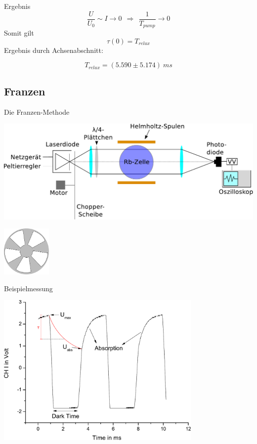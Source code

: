 \documentclass{beamer}
\begin{document}
\begin{frame}{Ergebnis}
$$\frac{U}{U_0} \sim I \to 0 \ \ \Rightarrow \ \ \frac{1}{T_{pump}} \to 0$$
Somit gilt $$\tau(0) = T_{relax}$$
Ergebnis durch Achsenabschnitt:

$$ T_{relax} = (5.590 \pm 5.174)\ ms$$ %

\end{frame}

\subsection{Franzen}
\begin{frame}{Die Franzen-Methode}
\begin{center}
\centering \includegraphics[width=\textwidth]{Bilder/ABFranzen.pdf}

\centering \includegraphics[width=0.18\textwidth]{Bilder/chopper.pdf}
\end{center}
\end{frame}

\begin{frame}{Beispielmessung}
\begin{center}
\centering \includegraphics[width=0.75\textwidth]{Bilder/FranzenBsp.pdf}
\end{center}
\end{frame}
\end{document}

